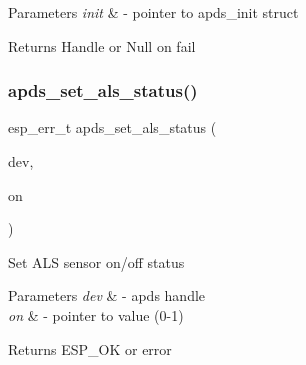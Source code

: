 \begin{DoxyParams}{Parameters}
{\em init} & -\/ pointer to apds\+\_\+init struct\\
\hline
\end{DoxyParams}
\begin{DoxyReturn}{Returns}
Handle or Null on fail 
\end{DoxyReturn}
\mbox{\label{group__APDS9960__SetStatusFunctions_gaaa00dd7cbd113a4b5e93f3842e6b2901}} 
\subsubsection{\texorpdfstring{apds\+\_\+set\+\_\+als\+\_\+status()}{apds\_set\_als\_status()}}
{\footnotesize\ttfamily esp\+\_\+err\+\_\+t apds\+\_\+set\+\_\+als\+\_\+status (\begin{DoxyParamCaption}\item[{\hyperlink{structAPDS9960__Driver}{A\+P\+D\+S\+\_\+\+D\+EV}}]{dev,  }\item[{\hyperlink{vl53l0x__types_8h_aba7bc1797add20fe3efdf37ced1182c5}{uint8\+\_\+t} $\ast$}]{on }\end{DoxyParamCaption})}




\begin{DoxyItemize}
\item Set A\+LS sensor on/off status 
\end{DoxyItemize}


\begin{DoxyParams}{Parameters}
{\em dev} & -\/ apds handle \\
\hline
{\em on} & -\/ pointer to value (0-\/1) \\
\hline
\end{DoxyParams}
\begin{DoxyReturn}{Returns}
E\+S\+P\+\_\+\+OK or error 
\end{DoxyReturn}
\mbox{\label{group__APDS9960__SetStatusFunctions_gaf9c424c2754e4b96894e73de810500a0}} 

